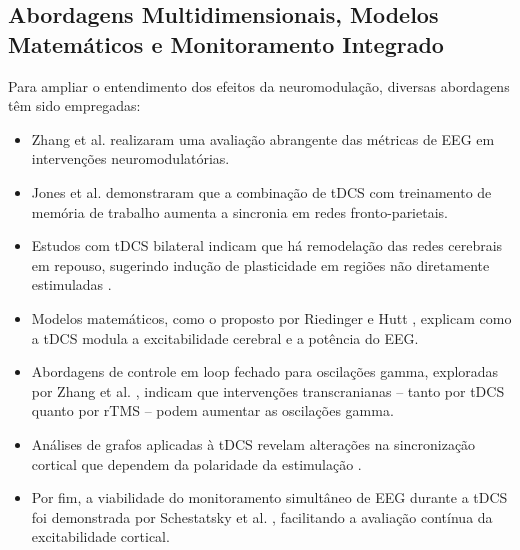 \subsection{Abordagens Multidimensionais, Modelos Matemáticos e Monitoramento Integrado}
Para ampliar o entendimento dos efeitos da neuromodulação, diversas abordagens têm sido empregadas:
\begin{itemize}
    \item Zhang et al. \cite{zhang2022multidimensional} realizaram uma avaliação abrangente das métricas de EEG em intervenções neuromodulatórias.
    \item Jones et al. \cite{jones2017frontoparietal} demonstraram que a combinação de tDCS com treinamento de memória de trabalho aumenta a sincronia em redes fronto-parietais.
    \item Estudos com tDCS bilateral indicam que há remodelação das redes cerebrais em repouso, sugerindo indução de plasticidade em regiões não diretamente estimuladas \cite{pellegrino2018bilateral}.
    \item Modelos matemáticos, como o proposto por Riedinger e Hutt \cite{riedinger2022model}, explicam como a tDCS modula a excitabilidade cerebral e a potência do EEG.
    \item Abordagens de controle em loop fechado para oscilações gamma, exploradas por Zhang et al. \cite{zhang2024closed}, indicam que intervenções transcranianas – tanto por tDCS quanto por rTMS – podem aumentar as oscilações gamma.
    \item Análises de grafos aplicadas à tDCS revelam alterações na sincronização cortical que dependem da polaridade da estimulação \cite{mancini2016assessing, pellegrino2019transcranial, schollmann2019anodal}.
    \item Por fim, a viabilidade do monitoramento simultâneo de EEG durante a tDCS foi demonstrada por Schestatsky et al. \cite{schesatsky2013simultaneous}, facilitando a avaliação contínua da excitabilidade cortical.
\end{itemize}

